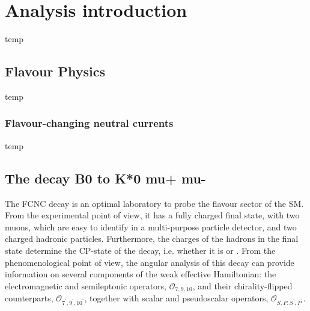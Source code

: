 \chapter{Analysis introduction}
\label{sec:theo}

temp

\section{Flavour Physics}
\label{sec:flav}

temp

\subsection{Flavour-changing neutral currents}
\label{sec:FCNC}

temp

\section{The decay B0 to K*0 mu+ mu-}
\label{sec:Kstmm}


The FCNC decay \BtoKstmumudecay is an optimal laboratory to probe the flavour sector of the SM.
From the experimental point of view, it has a fully charged final state, with two muons, which are easy to identify in a multi-purpose particle detector, and two charged hadronic particles.
Furthermore, the charges of the hadrons in the final state determine the CP-state of the decay, i.e. whether it is \BtoKstmumudecay or \BtoKstmumuconjdecay.
From the phenomenological point of view, the angular analysis of this decay can provide information on several components of the weak effective Hamiltonian: the electromagnetic and semileptonic operators, $\mathcal{O}_{7,9,10}$, and their chirality-flipped counterparts, $\mathcal{O}_{7^\prime,9^\prime,10^\prime}$, together with scalar and pseudoscalar operators, $\mathcal{O}_{S,P,S^\prime,P^\prime}$.


